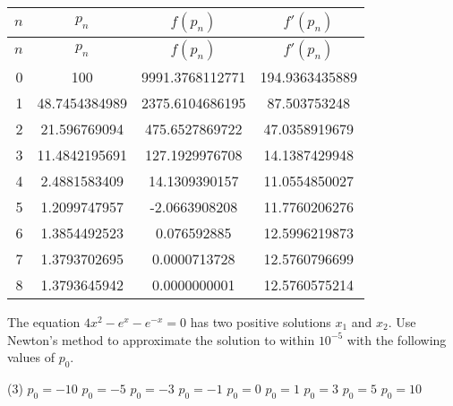 \documentclass[../../../../Assignments]{subfiles}
\begin{document}
\begin{solution}
\begin{enumerate}[label = \alph*)]
            \begin{longtable}{r S[table-format=3.10] S[table-format=4.10] S[table-format=3.10]}
                \toprule
                \(n\)  &     {\(p_n\)}    &    {\(f(p_n)\)}   &   {\(f'(p_n)\)}  \\
                \midrule
                \endfirsthead
                \(n\)  &     {\(p_n\)}    &    {\(f(p_n)\)}   &   {\(f'(p_n)\)}  \\
                \midrule
                  &  100             &  9991.3768112771  &  194.9363435889  \\
                    1  &   48.7454384989  &  2375.6104686195  &   87.503753248   \\
                    2  &   21.596769094   &   475.6527869722  &   47.0358919679  \\
                    3  &   11.4842195691  &   127.1929976708  &   14.1387429948  \\
                    4  &    2.4881583409  &    14.1309390157  &   11.0554850027  \\
                    5  &    1.2099747957  &    -2.0663908208  &   11.7760206276  \\
                    6  &    1.3854492523  &     0.076592885   &   12.5996219873  \\
                    7  &    1.3793702695  &     0.0000713728  &   12.5760796699  \\
                    8  &    1.3793645942  &     0.0000000001  &   12.5760575214  \\
                \bottomrule
            \end{longtable}
    \end{enumerate}
\end{solution}

\begin{exercise}
    The equation \(4x^2 - e^x - e^{-x} = 0\) has two positive solutions \(x_1\)
    and \(x_2\). Use Newton's method to approximate the solution to within
    \(10^{-5}\) with the following values of \(p_0\).

    \begin{tasks}(3)
        \task \(p_0 = -10\)
        \task \(p_0 = -5\)
        \task \(p_0 = -3\)
        \task \(p_0 = -1\)
        \task \(p_0 = 0\)
        \task \(p_0 = 1\)
        \task \(p_0 = 3\)
        \task \(p_0 = 5\)
        \task \(p_0 = 10\)
    \end{tasks}
\end{exercise}
\end{document}
